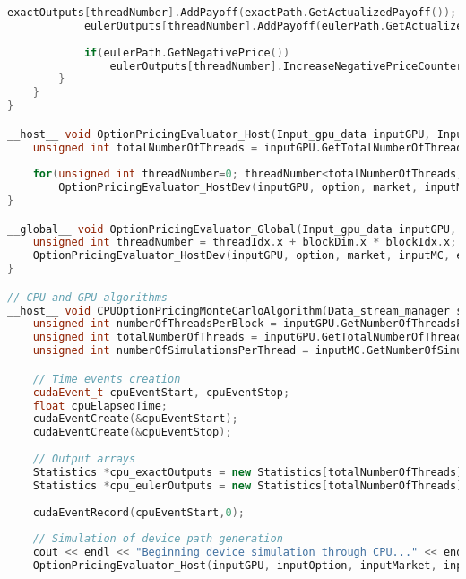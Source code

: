\begin{lstlisting}[language=C++, caption={\texttt{libraries/CoreLibraries/SupportFunctions/Support\_functions.cu}}]
			exactOutputs[threadNumber].AddPayoff(exactPath.GetActualizedPayoff());
			eulerOutputs[threadNumber].AddPayoff(eulerPath.GetActualizedPayoff());
			
			if(eulerPath.GetNegativePrice())
				eulerOutputs[threadNumber].IncreaseNegativePriceCounter();
		}
	}
}

__host__ void OptionPricingEvaluator_Host(Input_gpu_data inputGPU, Input_option_data option, Input_market_data market, Input_MC_data inputMC, Statistics* exactOutputs, Statistics* eulerOutputs, unsigned int seed){
	unsigned int totalNumberOfThreads = inputGPU.GetTotalNumberOfThreads();
	
	for(unsigned int threadNumber=0; threadNumber<totalNumberOfThreads; ++threadNumber)
		OptionPricingEvaluator_HostDev(inputGPU, option, market, inputMC, exactOutputs, eulerOutputs, seed, threadNumber);
}

__global__ void OptionPricingEvaluator_Global(Input_gpu_data inputGPU, Input_option_data option, Input_market_data market, Input_MC_data inputMC, Statistics* exactOutputs, Statistics* eulerOutputs, unsigned int seed){
	unsigned int threadNumber = threadIdx.x + blockDim.x * blockIdx.x;
	OptionPricingEvaluator_HostDev(inputGPU, option, market, inputMC, exactOutputs, eulerOutputs, seed, threadNumber);
}

// CPU and GPU algorithms
__host__ void CPUOptionPricingMonteCarloAlgorithm(Data_stream_manager streamManager, Input_gpu_data inputGPU, Input_option_data inputOption, Input_market_data inputMarket, Input_MC_data inputMC, unsigned int seed){
	unsigned int numberOfThreadsPerBlock = inputGPU.GetNumberOfThreadsPerBlock();
	unsigned int totalNumberOfThreads = inputGPU.GetTotalNumberOfThreads();
	unsigned int numberOfSimulationsPerThread = inputMC.GetNumberOfSimulationsPerThread(inputGPU);

	// Time events creation
	cudaEvent_t cpuEventStart, cpuEventStop;
	float cpuElapsedTime;
	cudaEventCreate(&cpuEventStart);
	cudaEventCreate(&cpuEventStop);
	
	// Output arrays
	Statistics *cpu_exactOutputs = new Statistics[totalNumberOfThreads];
	Statistics *cpu_eulerOutputs = new Statistics[totalNumberOfThreads];
	
	cudaEventRecord(cpuEventStart,0);
	
	// Simulation of device path generation
	cout << endl << "Beginning device simulation through CPU..." << endl;
	OptionPricingEvaluator_Host(inputGPU, inputOption, inputMarket, inputMC, cpu_exactOutputs, cpu_eulerOutputs, seed);
	

\end{lstlisting}
